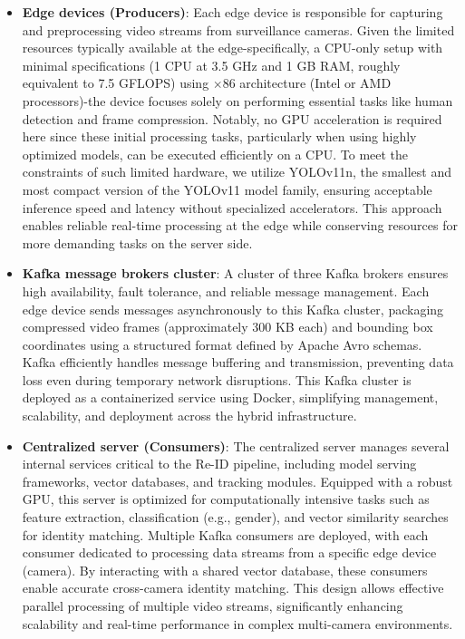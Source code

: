 \documentclass[../main.tex]{subfiles}
\begin{document}
\begin{itemize}
    \item \textbf{Edge devices (Producers)}: Each edge device is responsible for capturing and preprocessing video streams from surveillance cameras. Given the limited resources typically available at the edge-specifically, a CPU-only setup with minimal specifications (1 CPU at 3.5 GHz and 1 GB RAM, roughly equivalent to 7.5 GFLOPS) using $\times86$ architecture (Intel or AMD processors)-the device focuses solely on performing essential tasks like human detection and frame compression. Notably, no GPU acceleration is required here since these initial processing tasks, particularly when using highly optimized models, can be executed efficiently on a CPU. To meet the constraints of such limited hardware, we utilize YOLOv11n, the smallest and most compact version of the YOLOv11 model family, ensuring acceptable inference speed and latency without specialized accelerators. This approach enables reliable real-time processing at the edge while conserving resources for more demanding tasks on the server side.

    
    \item \textbf{Kafka message brokers cluster}: A cluster of three Kafka brokers ensures high availability, fault tolerance, and reliable message management. Each edge device sends messages asynchronously to this Kafka cluster, packaging compressed video frames (approximately 300 KB each) and bounding box coordinates using a structured format defined by Apache Avro schemas. Kafka efficiently handles message buffering and transmission, preventing data loss even during temporary network disruptions. This Kafka cluster is deployed as a containerized service using Docker, simplifying management, scalability, and deployment across the hybrid infrastructure.
    
    \item \textbf{Centralized server (Consumers)}: The centralized server manages several internal services critical to the Re-ID pipeline, including model serving frameworks, vector databases, and tracking modules. Equipped with a robust GPU, this server is optimized for computationally intensive tasks such as feature extraction, classification (e.g., gender), and vector similarity searches for identity matching. Multiple Kafka consumers are deployed, with each consumer dedicated to processing data streams from a specific edge device (camera). By interacting with a shared vector database, these consumers enable accurate cross-camera identity matching. This design allows effective parallel processing of multiple video streams, significantly enhancing scalability and real-time performance in complex multi-camera environments.
\end{itemize}
\end{document}

